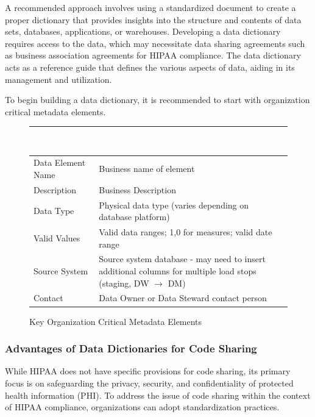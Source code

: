 A recommended approach involves using a standardized document to create a proper dictionary that provides insights into the structure and contents of data sets, databases, applications, or warehouses. Developing a data dictionary requires access to the data, which may necessitate data sharing agreements such as business association agreements for HIPAA compliance. The data dictionary acts as a reference guide that defines the various aspects of data, aiding in its management and utilization. 

To begin building a data dictionary, it is recommended to start with organization critical metadata elements. 

\begin{figure}[H]
\begin{center}
    \renewcommand{\arraystretch}{1.5}
    \begin{tabular}{|>{\raggedright\arraybackslash}m{3.5cm}
                    |>{\raggedright\arraybackslash}m{11cm}
                    |}
    \hline
    \rowcolor[HTML]{196fb4}\centering\textcolor{white}{\large Data Dictionary} 
                            & \centering\textcolor{white}{\large Description}
                            \tabularnewline 
    \hline
    Data Element Name & Business name of element \\\hline
    Description & Business Description \\\hline
    Data Type & Physical data type (varies depending on database platform) \\\hline
    Valid Values & Valid data ranges; 1,0 for measures; valid date range \\\hline
    Source System & Source system database - may need to insert additional columns for multiple load stops (staging, DW $\rightarrow$ DM) \\\hline
    Contact & Data Owner or Data Steward contact person \\\hline
    \end{tabular}
\end{center}
\caption{Key Organization Critical Metadata Elements}
\label{Data Dictionary}
\end{figure}

\subsubsection{Advantages of Data Dictionaries for Code Sharing}
While HIPAA does not have specific provisions for code sharing, its primary focus is on safeguarding the privacy, security, and confidentiality of protected health information (PHI). To address the issue of code sharing within the context of HIPAA compliance, organizations can adopt standardization practices. 

